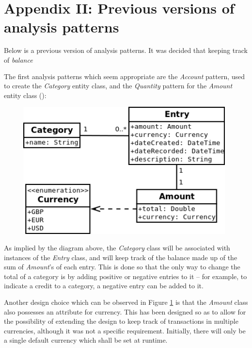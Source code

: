 \section{Appendix II: Previous versions of analysis patterns} \label{appendix2}
Below is a previous version of analysis patterns. It was decided that keeping track of \emph{balance}

The first analysis patterns which seem appropriate are the \emph{Account}
pattern, used to create the \emph{Category} entity class, and the
\emph{Quantity} pattern for the \emph{Amount} entity class
(\cite[][Sections~6.1~\&~3.1]{fowler1997analysis}):
\begin{figure}[ht!]
  \begin{center}
    \includegraphics[width=11cm]{./contents/img/Class_Diagram_-_Categories_and_Amount.png}
  \end{center}
  \caption{}
  \label{fig:ClassDiagram.CategoriesAndAmount}
\end{figure}
\FloatBarrier

As implied by the diagram above, the \emph{Category} class will be associated
with instances of the \emph{Entry} class, and will keep track of the balance
made up of the sum of \emph{Amount}'s of each entry. This is done so that the
only way to change the total of a category is by adding positive or negative
entries to it -- for example, to indicate a credit to a category, a negative
entry can be added to it.

Another design choice which can be observed in Figure
\ref{fig:ClassDiagram.CategoriesAndAmount} is that the \emph{Amount} class also
possesses an attribute for currency. This has been designed so as to allow for
the possibility of extending the design to keep track of transactions in
multiple currencies, although it was not a specific requirement. Initially,
there will only be a single default currency which shall be set at runtime.

